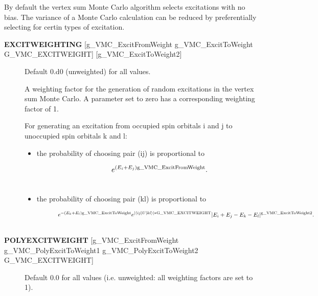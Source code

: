 \documentclass[openany,a4paper,10pt,english]{manual}
\newcommand{\bra}{\ensuremath{\langle}}
\newcommand{\ket}{\ensuremath{\rangle}}
\begin{document}
By default the vertex sum Monte Carlo algorithm selects excitations
with no bias.  The variance of a Monte Carlo calculation can be reduced
by preferentially selecting for certin types of excitation.
\begin{description}
\item[\textbf{EXCITWEIGHTING} {[}g\_VMC\_ExcitFromWeight g\_VMC\_ExcitToWeight G\_VMC\_EXCITWEIGHT{]} {[}g\_VMC\_ExcitToWeight2{]}] \leavevmode
Default 0.d0 (unweighted) for all values.

A weighting factor for the generation of random excitations in the
vertex sum Monte Carlo.  A parameter set to zero has a corresponding
weighting factor of 1.

For generating an excitation from occupied spin orbitals i and j to
unoccupied spin orbitals k and l:
\begin{itemize}
\item {} \begin{description}
\item[the probability of choosing pair (ij) is proportional to] \leavevmode\begin{gather}
\begin{split}e^{(E_i+E_j) \text{g\_VMC\_ExcitFromWeight} }.\end{split}\notag\\\begin{split}\end{split}\notag
\end{gather}
\end{description}

\item {} \begin{description}
\item[the probability of choosing pair (kl) is proportional to] \leavevmode\begin{gather}
\begin{split}e^{-(E_k+E_l) \text{g\_VMC\_ExcitToWeight}} e^{|\bra ij|U|kl\ket|*\text{G\_VMC\_EXCITWEIGHT}} |E_i+E_j-E_k-E_l|^{\text{g\_VMC\_ExcitToWeight2}}.\end{split}\notag\\\begin{split}\end{split}\notag
\end{gather}
\end{description}

\end{itemize}

\item[\textbf{POLYEXCITWEIGHT} {[}g\_VMC\_ExcitFromWeight g\_VMC\_PolyExcitToWeight1 g\_VMC\_PolyExcitToWeight2 G\_VMC\_EXCITWEIGHT{]}] \leavevmode
Default 0.0 for all values (i.e. unweighted: all weighting factors
are set to 1).


\end{description}
\end{document}
